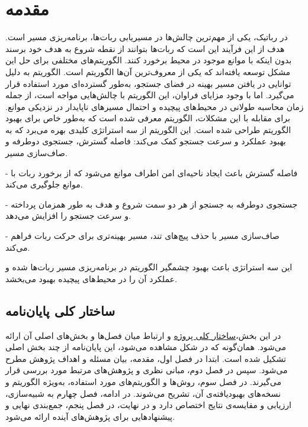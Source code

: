\chapter{مقدمه} \label{yd}
در رباتیک، یکی از مهم‌ترین چالش‌ها در مسیریابی ربات‌ها، برنامه‌ریزی مسیر است. هدف از این فرآیند این است که ربات‌ها بتوانند از نقطه شروع به هدف خود برسند بدون اینکه با موانع موجود در محیط برخورد کنند. الگوریتم‌های مختلفی برای حل این مشکل توسعه یافته‌اند که یکی از معروف‌ترین آن‌ها الگوریتم  است. الگوریتم  به دلیل توانایی در یافتن مسیر بهینه در فضای جستجو، به‌طور گسترده‌ای مورد استفاده قرار می‌گیرد. اما با وجود مزایای فراوان، این الگوریتم با چالش‌هایی مواجه است، از جمله زمان محاسبه طولانی در محیط‌های پیچیده و احتمال مسیرهای ناپایدار در نزدیکی موانع. برای مقابله با این مشکلات، الگوریتم   معرفی شده است که به‌طور خاص برای بهبود الگوریتم   طراحی شده است. این الگوریتم از سه استراتژی کلیدی بهره می‌برد که به بهبود عملکرد و سرعت جستجو کمک می‌کند: فاصله گسترش، جستجوی دوطرفه و صاف‌سازی مسیر.

- فاصله گسترش باعث ایجاد ناحیه‌ای امن اطراف موانع می‌شود که از برخورد ربات با موانع جلوگیری می‌کند.

- جستجوی دوطرفه به جستجو از هر دو سمت شروع و هدف به طور همزمان پرداخته و سرعت جستجو را افزایش می‌دهد.

- صاف‌سازی مسیر با حذف پیچ‌های تند، مسیر بهینه‌تری برای حرکت ربات فراهم می‌کند.

این سه استراتژی باعث بهبود چشمگیر الگوریتم  در برنامه‌ریزی مسیر ربات‌ها شده و عملکرد آن را در محیط‌های پیچیده بهبود می‌بخشد.
\section{ساختار کلی پایان‌نامه}

در این بخش،\hyperref[structure]{ساختار کلی پروژه}
 و ارتباط میان فصل‌ها و بخش‌های اصلی آن ارائه می‌شود. همان‌گونه که در شکل مشاهده می‌شود، این پایان‌نامه از چند بخش اصلی تشکیل شده است. ابتدا در فصل اول، مقدمه، بیان مسئله و اهداف پژوهش مطرح می‌شود. سپس در فصل دوم، مبانی نظری و پژوهش‌های مرتبط مورد بررسی قرار می‌گیرند. در فصل سوم، روش‌ها و الگوریتم‌های مورد استفاده، به‌ویژه الگوریتم  و نسخه‌های بهبود‌یافته‌ی آن، تشریح می‌شوند. در ادامه، فصل چهارم به شبیه‌سازی، ارزیابی و مقایسه‌ی نتایج اختصاص دارد و در نهایت، در فصل پنجم، جمع‌بندی نهایی و پیشنهادهایی برای پژوهش‌های آینده ارائه می‌شود.

